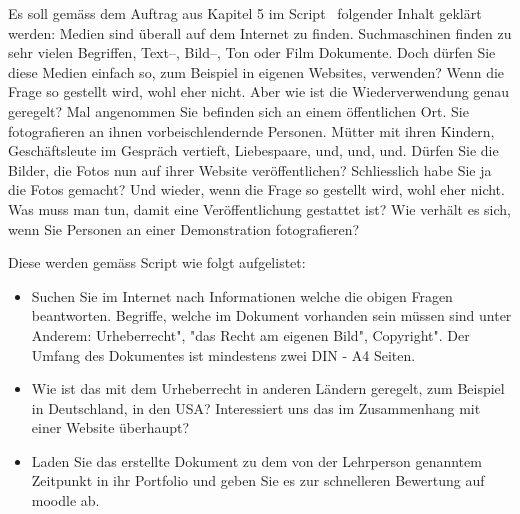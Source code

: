 
\label{einleitung}
\setcounter{page}{1}
\normalsize
Es soll gemäss dem Auftrag aus Kapitel 5 im Script~\cite{sterchi} folgender Inhalt geklärt werden:\newline\newline
Medien sind überall auf dem Internet zu finden.
Suchmaschinen finden zu sehr vielen Begriffen,
Text–, Bild–, Ton oder Film Dokumente.
Doch dürfen Sie diese Medien einfach so, zum Beispiel in
eigenen Websites, verwenden?\newline\newline
Wenn die Frage so gestellt wird, wohl eher nicht.
Aber wie ist die Wiederverwendung genau geregelt?\newline\newline
Mal angenommen Sie befinden sich an einem öffentlichen Ort.
Sie fotografieren an ihnen vorbeischlendernde Personen.
Mütter mit ihren Kindern, Geschäftsleute im Gespräch vertieft, Liebespaare, und, und, und.
Dürfen Sie die Bilder, die Fotos nun auf ihrer Website veröffentlichen?
Schliesslich habe Sie ja die Fotos gemacht?\newline\newline
Und wieder, wenn die Frage so gestellt wird, wohl eher nicht.
Was muss man tun, damit eine Veröffentlichung gestattet ist?\newline\newline
Wie verhält es sich, wenn Sie Personen an einer Demonstration fotografieren?

Diese werden gemäss Script wie folgt aufgelistet:
\begin{itemize}
    \item Suchen Sie im Internet nach Informationen welche die obigen Fragen beantworten.
    Begriffe, welche im Dokument vorhanden sein müssen sind unter Anderem: \dq Urheberrecht", "das Recht am eigenen Bild", \dq Copyright".
    Der Umfang des Dokumentes ist mindestens zwei DIN - A4 Seiten.
    \item Wie ist das mit dem Urheberrecht in anderen Ländern geregelt, zum Beispiel in Deutschland,
    in den USA? Interessiert uns das im Zusammenhang mit einer Website überhaupt?
    \item Laden Sie das erstellte Dokument zu dem von der Lehrperson genanntem Zeitpunkt in ihr
    Portfolio und geben Sie es zur schnelleren Bewertung auf moodle ab.
\end{itemize}

